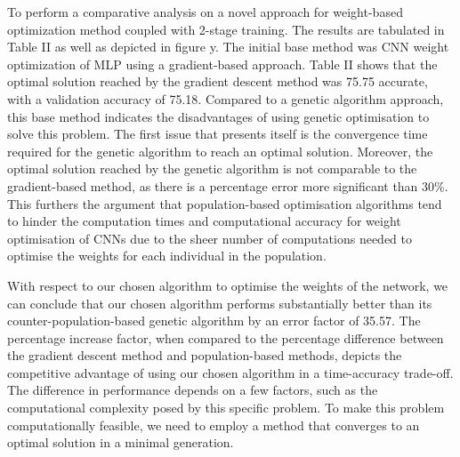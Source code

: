\documentclass[conference]{IEEEtran}
\begin{document}
\par
To perform a comparative analysis on a novel approach for weight-based optimization method coupled with 2-stage training. The results are tabulated in Table II as well as depicted in figure y. The initial base method was CNN weight optimization of MLP using a gradient-based approach. Table II shows that the optimal solution reached by the gradient descent method was 75.75 accurate, with a validation accuracy of 75.18. Compared to a genetic algorithm approach, this base method indicates the disadvantages of using genetic optimisation to solve this problem. The first issue that presents itself is the convergence time required for the genetic algorithm to reach an optimal solution. Moreover, the optimal solution reached by the genetic algorithm is not comparable to the gradient-based method, as there is a percentage error more significant than 30\%. This furthers the argument that population-based optimisation algorithms tend to hinder the computation times and computational accuracy for weight optimisation of CNNs due to the sheer number of computations needed to optimise the weights for each individual in the population.
\par
With respect to our chosen algorithm to optimise the weights of the network, we can conclude that our chosen algorithm performs substantially better than its counter-population-based genetic algorithm by an error factor of 35.57. The percentage increase factor, when compared to the percentage difference between the gradient descent method and population-based methods, depicts the competitive advantage of using our chosen algorithm in a time-accuracy trade-off. The difference in performance depends on a few factors, such as the computational complexity posed by this specific problem. To make this problem computationally feasible, we need to employ a method that converges to an optimal solution in a minimal generation. 
\begin{figure}[!ht]

\centering{}

\caption{}
\label{fig:cnnj}
\end{figure}
\end{document}
